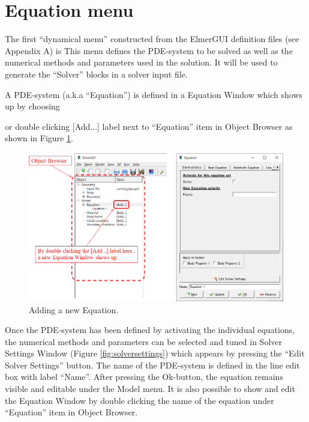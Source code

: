 \section{Equation menu}

The first ``dynamical menu'' constructed from the ElmerGUI definition files (see Appendix A) is
\noindent This menu defines the PDE-system to be solved as well as the numerical
methods and parameters used in the solution. It will be used to generate the ``Solver''
blocks in a solver input file.

A PDE-system (a.k.a ``Equation'') is defined in a Equation Window which shows up by choosing

\noindent or double clicking [Add...] label next to ``Equation'' item in Object Browser as shown in Figure \ref{fig:equation}.

\begin{figure}[htb]
\begin{center}
 \includegraphics[scale=0.5]{images/equation.png}
\caption{Adding a new Equation.}
\label{fig:equation}
\end{center}
\end{figure}

Once the PDE-system has been defined by activating the individual equations, the numerical
methods and parameters can be selected and tuned in Solver Settings Window (Figure \ref{fig:solversettings}) which appears by pressing the ``Edit Solver Settings'' button.
The name of the PDE-system is defined in the line edit box with label ``Name''. After pressing
the Ok-button, the equation remains visible and editable under the Model menu. 
It is also possible to show and edit the Equation Window by double clicking the name of the equation under ``Equation'' item in Object Browser.

